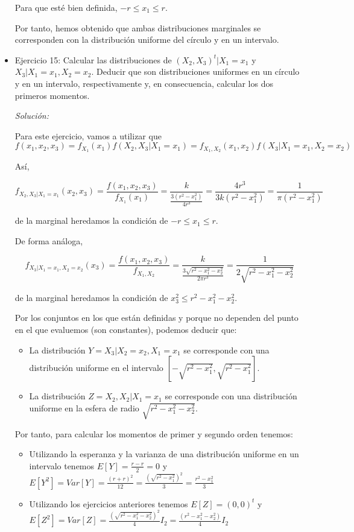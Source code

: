 \documentclass{article}
\theoremstyle{theorem-style}  %
\theoremstyle{definition}
\theoremstyle{example-style}
\begin{document}
\begin{itemize}
		Para que esté bien definida, $-r \leq x_1 \leq r$.
		
		Por tanto, hemos obtenido que ambas distribuciones marginales se corresponden con la distribución uniforme del círculo y en un intervalo. 
		
		\item Ejercicio 15:  Calcular las distribuciones de $(X_2, X_3)^t|X_1=x_1$ y $X_3|X_1=x_1, X_2=x_2$. Deducir que son distribuciones uniformes en un círculo y en un intervalo, respectivamente y, en consecuencia, calcular los dos primeros momentos.
		
		\textit{Solución: }
		
		Para este ejercicio, vamos a utilizar que $f(x_1, x_2, x_3) = f_{X_1}(x_1) f(X_2, X_3 | X_1 = x_1) = f_{X_1 , X_2}(x_1, x_2) f(X_3 | X_1 = x_1, X_2 = x_2) $
		
		Así, 
		
		\[
			f_{X_2, X_3| X_1 = x_1}(x_2, x_3) =  \frac{f(x_1,x_2,x_3)} {f_{X_1} (x_1)} = \frac{k}{ \frac{3 (r^2 - x_1^2)}{4 r^3} } = \frac{4 r^3}{3 k (r^2 - x_1^2)} = \frac{1}{\pi (r^2 - x_1^2)} 
		\]
		
		de la marginal heredamos la condición de $-r \leq x_1 \leq r$.
		
		De forma análoga,
		
		\[
			f_{ X_3| X_1 = x_1, X_2 = x_2}(x_3) = \frac{f(x_1, x_2, x_3)}{f_{X_1, X_2}}  = \frac{k}{\frac{3 \sqrt{r^2 - x_1^2 - x_2^2}}{2 \pi r^3}} = \frac{1}{ 2 \sqrt{r^2 - x_1^2 - x_2^2}}
		\] 
		
		de la marginal heredamos la condición de $x_3 ^ 2 \leq r^2 - x_1^2 - x_2^2$.
		
		Por los conjuntos en los que están definidas y porque no dependen del punto en el que evaluemos (son constantes), podemos deducir que:
		
		\begin{itemize}
			\item La distribución $Y = X_3|X_2 = x_2, X_1 = x_1$ se corresponde con una distribución uniforme en el intervalo $[-\sqrt{r^2 - x_1^2},\sqrt{r^2 - x_1^2}]$.
			
			\item La distribución $Z =X_2, X_2|X_1 = x_1$ se corresponde con una distribución uniforme  en la esfera de radio $\sqrt{r^2 -x_1^2 - x_2^2}$.
		\end{itemize}
	
		Por tanto, para calcular los momentos de primer y segundo orden tenemos:
		\begin{itemize}
			\item Utilizando la esperanza y la varianza de una distribución uniforme en un intervalo tenemos $E[Y] = \frac{r -r}{2} = 0$ y $E[Y^2] = Var[Y] = \frac{(r+r)^2}{12} = \frac{(\sqrt{r^2 - x_1^2})^2}{3} = \frac{r^2 - x_1^2}{3}$
			\item Utilizando los ejercicios anteriores tenemos $E[Z] = (0,0)^t$ y $E[Z^2] = Var[Z] = \frac{(\sqrt{r^2 -x_1^2 - x_2^2})^2}{4}I_2 = \frac{(r^2 -x_1^2 - x_2^2)}{4}I_2$ 
		\end{itemize}
		
	\end{itemize}
	
\end{document}
